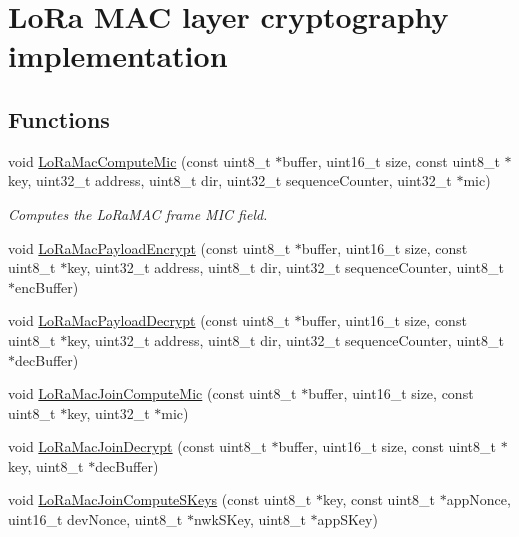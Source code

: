 \hypertarget{group___l_o_r_a_m_a_c___c_r_y_p_t_o}{}\section{Lo\+Ra M\+AC layer cryptography implementation}
\label{group___l_o_r_a_m_a_c___c_r_y_p_t_o}
\subsection*{Functions}
\begin{DoxyCompactItemize}
\item 
void \mbox{\hyperlink{group___l_o_r_a_m_a_c___c_r_y_p_t_o_ga6ee265070494b83255e7fdc4dff985da}{Lo\+Ra\+Mac\+Compute\+Mic}} (const uint8\+\_\+t $\ast$buffer, uint16\+\_\+t size, const uint8\+\_\+t $\ast$key, uint32\+\_\+t address, uint8\+\_\+t dir, uint32\+\_\+t sequence\+Counter, uint32\+\_\+t $\ast$mic)
\begin{DoxyCompactList}\small\item\em Computes the Lo\+Ra\+M\+AC frame M\+IC field. \end{DoxyCompactList}\item 
void \mbox{\hyperlink{group___l_o_r_a_m_a_c___c_r_y_p_t_o_ga50339e60abea2186ca7e584b489718b1}{Lo\+Ra\+Mac\+Payload\+Encrypt}} (const uint8\+\_\+t $\ast$buffer, uint16\+\_\+t size, const uint8\+\_\+t $\ast$key, uint32\+\_\+t address, uint8\+\_\+t dir, uint32\+\_\+t sequence\+Counter, uint8\+\_\+t $\ast$enc\+Buffer)
\item 
void \mbox{\hyperlink{group___l_o_r_a_m_a_c___c_r_y_p_t_o_ga41f9ba19f61b195420914ed58c8b94c7}{Lo\+Ra\+Mac\+Payload\+Decrypt}} (const uint8\+\_\+t $\ast$buffer, uint16\+\_\+t size, const uint8\+\_\+t $\ast$key, uint32\+\_\+t address, uint8\+\_\+t dir, uint32\+\_\+t sequence\+Counter, uint8\+\_\+t $\ast$dec\+Buffer)
\item 
void \mbox{\hyperlink{group___l_o_r_a_m_a_c___c_r_y_p_t_o_gac9216af326316c9e7f207d4e73aed199}{Lo\+Ra\+Mac\+Join\+Compute\+Mic}} (const uint8\+\_\+t $\ast$buffer, uint16\+\_\+t size, const uint8\+\_\+t $\ast$key, uint32\+\_\+t $\ast$mic)
\item 
void \mbox{\hyperlink{group___l_o_r_a_m_a_c___c_r_y_p_t_o_gac2379cd7cbeb6febaa2a7be5d9f04b5c}{Lo\+Ra\+Mac\+Join\+Decrypt}} (const uint8\+\_\+t $\ast$buffer, uint16\+\_\+t size, const uint8\+\_\+t $\ast$key, uint8\+\_\+t $\ast$dec\+Buffer)
\item 
void \mbox{\hyperlink{group___l_o_r_a_m_a_c___c_r_y_p_t_o_gad6fc2ace27fa388ec860fc2e5ae1f544}{Lo\+Ra\+Mac\+Join\+Compute\+S\+Keys}} (const uint8\+\_\+t $\ast$key, const uint8\+\_\+t $\ast$app\+Nonce, uint16\+\_\+t dev\+Nonce, uint8\+\_\+t $\ast$nwk\+S\+Key, uint8\+\_\+t $\ast$app\+S\+Key)
\end{DoxyCompactItemize}


